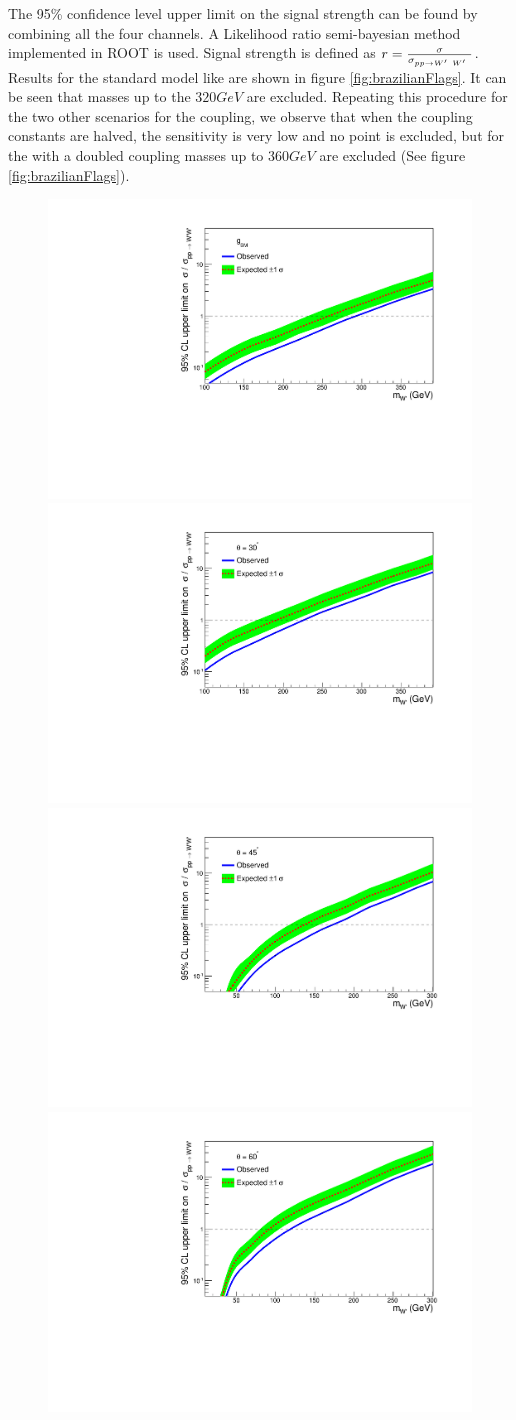 The 95\% confidence level upper limit on the signal strength can be found by combining all the four channels. A Likelihood ratio semi-bayesian method implemented in ROOT \cite{Brun:1997pa} is used. Signal strength is defined as $r = \frac{ \sigma }{\sigma_{pp \to W^\prime~W^\prime~} }$. Results for the standard model like \wprime are shown in figure  \ref{fig:brazilianFlags}. It can be seen that \wprime masses up to the $320GeV$ are excluded.  Repeating this procedure for the two other scenarios for the coupling, we observe that when the coupling constants are halved, the sensitivity is very low and no point is excluded, but for the \wprime with a doubled coupling masses up to $360GeV$ are excluded (See figure \ref{fig:brazilianFlags}).
\begin{figure}[!htb]
  \centering
  \includegraphics*[width=.45\textwidth]{figs/mix0b.pdf}
  \vspace{3mm}	
  \includegraphics*[width=.45\textwidth]{figs/mix30b.pdf}
  \hspace{3mm}
  \includegraphics*[width=.45\textwidth]{figs/mix45b.pdf}
  \vspace{3mm}	
  \includegraphics*[width=.45\textwidth]{figs/mix60b.pdf}

\end{figure}
